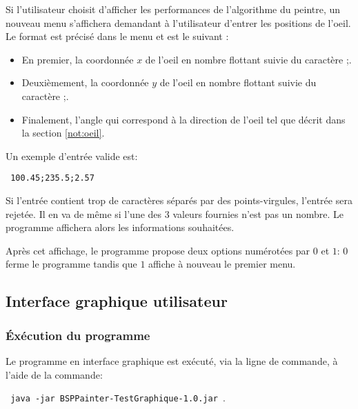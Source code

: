 Si l'utilisateur choisit d'afficher les performances de l'algorithme
du peintre, un nouveau menu s'affichera demandant à l'utilisateur
d'entrer les positions de l'oeil. Le format est précisé
dans le menu et est le suivant :
\begin{itemize}
\item En premier, la coordonnée $x$ de l'oeil en nombre
  flottant suivie du caractère \og;\fg{}.
\item Deuxièmement, la coordonnée $y$ de l'oeil en
  nombre flottant suivie du caractère \og;\fg.
\item Finalement, l'angle qui correspond à la direction
  de l'oeil tel que décrit dans la section \ref{not:oeil}.
\end{itemize}
Un exemple d'entrée valide est:
\begin{center}
  \texttt{
    100.45;235.5;2.57
  }
\end{center}

Si l'entrée contient trop de caractères séparés par des points-virgules,
l'entrée sera rejetée. Il en va de même si l'une des 3 valeurs fournies
n'est pas un nombre.
Le programme affichera alors les informations souhaitées.

Après cet affichage, le programme propose deux options numérotées par
$0$ et $1$: $0$ ferme le programme tandis que $1$ affiche à nouveau
le premier menu.

\subsection{Interface graphique utilisateur}
\subsubsection*{\'Exécution du programme}
Le programme en interface graphique est exécuté, via la ligne de commande,
à l'aide de la commande:
\begin{center}
  \texttt{
    java -jar BSPPainter-TestGraphique-1.0.jar
  }.
\end{center}
